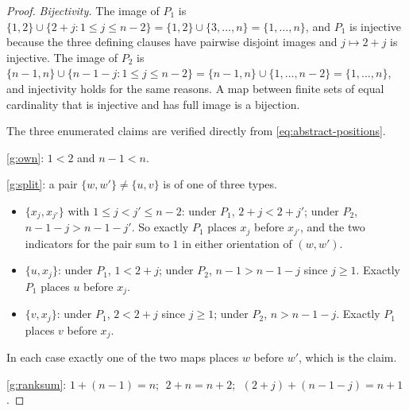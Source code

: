 \documentclass[11pt]{article}
\begin{document}
\begin{proof}
\emph{Bijectivity.}  The image of $P_1$ is $\{1,2\}\cup\{2+j:1\le j\le n-2\}=\{1,2\}\cup\{3,\ldots,n\}=\{1,\ldots,n\}$, and $P_1$ is injective because the three defining clauses have pairwise disjoint images and $j\mapsto 2+j$ is injective.  The image of $P_2$ is $\{n-1,n\}\cup\{n-1-j:1\le j\le n-2\}=\{n-1,n\}\cup\{1,\ldots,n-2\}=\{1,\ldots,n\}$, and injectivity holds for the same reasons.  A map between finite sets of equal cardinality that is injective and has full image is a bijection.

The three enumerated claims are verified directly from \eqref{eq:abstract-positions}.

\ref{g:own}: $1<2$ and $n-1<n$.

\ref{g:split}: a pair $\{w,w'\}\ne\{u,v\}$ is of one of three types.
\begin{itemize}
\item $\{x_j,x_{j'}\}$ with $1\le j<j'\le n-2$: under $P_1$, $2+j<2+j'$; under $P_2$, $n-1-j>n-1-j'$.  So exactly $P_1$ places $x_j$ before $x_{j'}$, and the two indicators for the pair sum to $1$ in either orientation of $(w,w')$.
\item $\{u,x_j\}$: under $P_1$, $1<2+j$; under $P_2$, $n-1>n-1-j$ since $j\ge 1$.  Exactly $P_1$ places $u$ before $x_j$.
\item $\{v,x_j\}$: under $P_1$, $2<2+j$ since $j\ge 1$; under $P_2$, $n>n-1-j$.  Exactly $P_1$ places $v$ before $x_j$.
\end{itemize}
In each case exactly one of the two maps places $w$ before $w'$, which is the claim.

\ref{g:ranksum}: $1+(n-1)=n$; $\;2+n=n+2$; $\;(2+j)+(n-1-j)=n+1$.
\end{proof}
\end{document}
